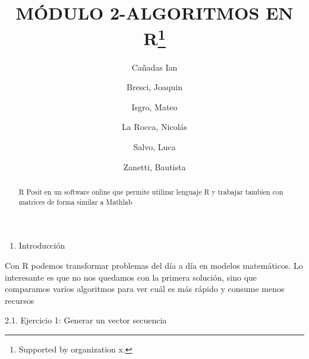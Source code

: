 \documentclass[runningheads]{llncs}
\newenvironment{Shaded}{\begin{snugshade}}{\end{snugshade}}
\newcommand{\AttributeTok}[1]{\textcolor[rgb]{0.13,0.29,0.53}{#1}}
\newcommand{\CommentTok}[1]{\textcolor[rgb]{0.56,0.35,0.01}{\textit{#1}}}
\newcommand{\ConstantTok}[1]{\textcolor[rgb]{0.56,0.35,0.01}{#1}}
\newcommand{\DecValTok}[1]{\textcolor[rgb]{0.00,0.00,0.81}{#1}}
\newcommand{\FunctionTok}[1]{\textcolor[rgb]{0.13,0.29,0.53}{\textbf{#1}}}
\newcommand{\NormalTok}[1]{#1}
\newcommand{\OtherTok}[1]{\textcolor[rgb]{0.56,0.35,0.01}{#1}}
\newcommand{\SpecialCharTok}[1]{\textcolor[rgb]{0.81,0.36,0.00}{\textbf{#1}}}
\providecommand{\tightlist}{%
  \setlength{\itemsep}{0pt}\setlength{\parskip}{0pt}}
\begin{document}
\title{MÓDULO 2-ALGORITMOS EN R\thanks{Supported by organization x.}}
%
%
\author{Cañadas Ian \and Bresci, Joaquin \and Isgro,
Mateo \and La Rocca, Nicolás \and Salvo,
Luca \and Zanetti, Bautista}


%


\maketitle              %
%
\begin{abstract}
R Posit en un software online que permite utilizar lenguaje R y trabajar
tambien con matrices de forma similar a Mathlab


\end{abstract}

\begin{enumerate}
\def\labelenumi{\arabic{enumi}.}
\tightlist
\item
  Introducción
\end{enumerate}

Con R podemos transformar problemas del día a día en modelos
matemáticos. Lo interesante es que no nos quedamos con la primera
solución, sino que comparamos varios algoritmos para ver cuál es más
rápido y consume menos recursos

2.1. Ejercicio 1: Generar un vector secuencia

\begin{Shaded}
\end{Shaded}
\end{document}
